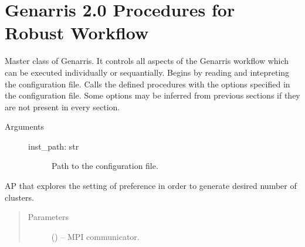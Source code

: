 \documentclass[letterpaper,10pt,english]{sphinxmanual}
\begin{document}
\chapter{Genarris 2.0 Procedures for Robust Workflow}
\label{\detokenize{index:genarris-2-0-procedures-for-robust-workflow}}

\begin{fulllineitems}
\label{\detokenize{index:Genarris.genarris_master.Genarris}}
Master class of Genarris. It controls all aspects of the
Genarris workflow which can be executed individually or sequantially.
Begins by reading and intepreting the configuration file.
Calls the defined procedures with the options specified in the
configuration file. Some options may be inferred from previous sections
if they are not present in every section.
\begin{description}
\item[{Arguments}] \leavevmode\begin{description}
\item[{inst\_path: str}] \leavevmode
Path to the configuration file.

\end{description}

\end{description}

\begin{fulllineitems}
\label{\detokenize{index:Genarris.genarris_master.Genarris.Affinity_Propagation_Fixed_Clusters}}
AP that explores the setting of preference in order to generate
desired number of clusters.
\begin{quote}\begin{description}
\item[{Parameters}] \leavevmode
{} () -- MPI communicator.

\end{description}\end{quote}

\end{fulllineitems}
\end{fulllineitems}
\end{document}
